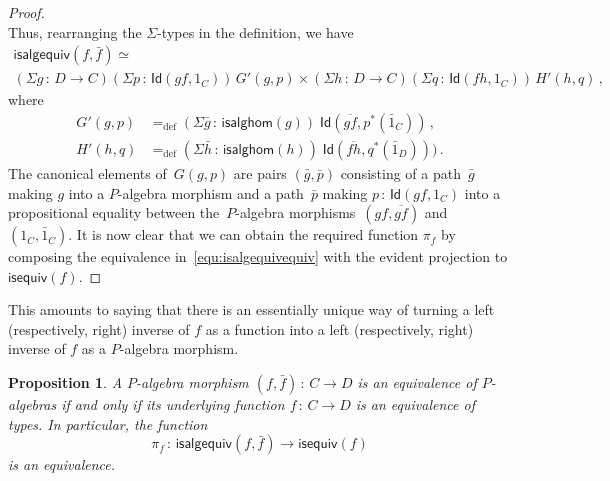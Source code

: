 \documentclass[10pt,a4paper,oneside,reqno]{amsart}
\numberwithin{equation}{section}
\theoremstyle{mythm}
\newtheorem{proposition}[theorem]{Proposition}
\theoremstyle{mydef}
\theoremstyle{myrmk}
\newcommand{\defeq}{=_{\mathrm{def}}}
\newcommand{\co}{\,{:}\,}
\newcommand{\isequiv}{\mathsf{isequiv}}
\newcommand{\Id}{\mathsf{Id}}
\newcommand{\isalgequiv}{\mathsf{isalgequiv}}
\begin{document}
\begin{proof}
\[\]
Thus, rearranging the $\Sigma$-types in the definition, we have
\begin{multline}
\label{equ:isalgequivequiv}
\isalgequiv(f, \bar{f}) \simeq \\ 
 (\Sigma g \co D \to C)  (\Sigma p \co \Id(g f ,  1_C) ) \, G'(g,p) \times
   (\Sigma h \co D \to C)   (\Sigma q \co \Id( f h ,  1_C) )\,  H'(h,q) \, ,
\end{multline}
where 
\begin{align}
G'(g,p)  & \defeq (\Sigma \bar{g} \co \mathsf{isalghom}(g)) \; \Id( \overline{gf}, p^*(\bar{1}_C)) \, , \label{equ:alggp} \\
H'(h,q)  & \defeq (\Sigma \bar{h} \co \mathsf{isalghom}(h)) \; \Id( \overline{fh}, q^*(\bar{1}_D)) ) \, .  \label{equ:alghq}
\end{align}
The  canonical elements of~$G(g,p)$ are pairs $(\bar{g}, \bar{p})$ consisting of  a path~$\bar{g}$ making
$g$ into a $P$-algebra morphism and a path~$\bar{p}$ making $p \co \Id(gf, 1_C)$ into a propositional
equality between the~$P$-algebra morphisms~$(gf, \overline{gf})$ and~$(1_C, \bar{1}_C)$. It is now
clear that we can obtain the required function $\pi_f$ by composing the equivalence in~\eqref{equ:isalgequivequiv}
with the evident projection to $\isequiv(f)$. 
\end{proof} 

This amounts to saying that there is an essentially unique way of turning a left
(respectively, right) inverse of $f$ as a function into a left (respectively, right) inverse of $f$
as a $P$-algebra morphism.

\begin{proposition}\label{WAlgSpace} A $P$-algebra morphism $(f, \bar{f}) \co C \to D$ is an equivalence of
$P$-algebras if and only
if its underlying function $f \co C \to D$ is an equivalence of types. In particular, the function 
\[
\pi_f \co \isalgequiv(f, \bar{f})  \to \mathsf{isequiv}(f)  
\]
is an equivalence. 
\end{proposition}  
\end{document}
